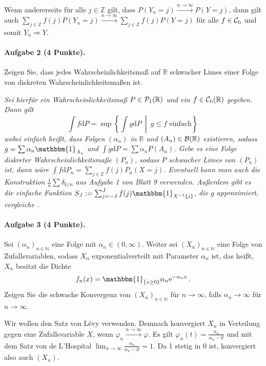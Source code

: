 \documentclass{article}
\begin{document}
Wenn andererseits für alle $j\in\mathbb{Z}$ gilt, dass $P(Y_n=j)\xrightarrow{n\to\infty}P(Y=j)$, dann gilt auch $\sum_{j\in\mathbb{Z}}f(j)P(Y_n=j)\xrightarrow{n\to\infty}\sum_{j\in\mathbb{Z}}f(j)P(Y=j)$ für alle $f\in{\cal C}_\mathrm{b}$ und somit $Y_n\Rightarrow Y$.
\newpage

\paragraph{Aufgabe 2 \textnormal{(4 Punkte)}.}
Zeigen Sie, dass jedes Wahrscheinlichkeitsmaß auf $\mathbb{R}$ schwacher Limes einer Folge von diskreten Wahrscheinlichkeitsmaßen ist.

\emph{Sei hierfür ein Wahrscheinlichkeitsmaß $P\in{\cal P}_1(\mathbb{R})$ und ein $f\in{\cal C}_\mathrm{b}(\mathbb{R})$ gegeben.
Dann gilt
\[
\int f\mathrm{d}P=\sup\left\{\int g\mathrm{d}P~\middle\vert~ g\leq f\text{ einfach}\right\}\,
\]
wobei einfach heißt, dass Folgen $(\alpha_n)$ in $\mathbb{R}$ und $(A_n)\in{\cal B}(\mathbb{R})$ existieren, sodass $g=\sum\alpha_n \mathbbm{1}_{A_n}$ und $\int g\mathrm{d}P=\sum\alpha_n P(A_n)$.
Gebe es eine Folge diskreter Wahrscheinlichkeitsmaße $(P_n)$, sodass $P$ schwacher Limes von $(P_n)$ ist, dann wäre $\int f\mathrm{d}P_n=\sum_{j\in\mathbb{Z}}f(j)P_n(X=j)$.
Eventuell kann man auch die Konstruktion $\frac{1}{n}\sum\delta_{k/n}$ aus Aufgabe 1 von Blatt 9 verwenden.
Außerdem gibt es die einfache Funktion $S_J:=\sum_{j=-J}^Jf(j)\mathbbm{1}_{X^{-1}\{j\}}$, die $g$ approximiert, vergleiche \cite{217980}.}
\newpage

\paragraph{Aufgabe 3 \textnormal{(4 Punkte)}.} Sei $(\alpha_n)_{n\in\mathbb{N}}$ eine Folge mit $\alpha_n\in(0,\infty)$.
Weiter sei $(X_n)_{n\in\mathbb{N}}$ eine Folge von Zufallsvariablen, sodass $X_n$ exponentialverteilt mit Parameter $\alpha_n$ ist, das heißt, $X_n$ besitzt die Dichte
\[
  f_n(x)=\mathbbm{1}_{\{x\geq0\}}\alpha_n\mathrm{e}^{-\alpha_n x}\,.
\]
Zeigen Sie die schwache Konvergenz von $(X_n)_{n\in\mathbb{N}}$ für $n\to\infty$, falls $\alpha_n\to\infty$ für $n\to\infty$.

Wir wollen den Satz von Lévy verwenden.
Demnach konvergiert $X_n$ in Verteilung gegen eine Zufallsvariable $X$, wenn $\varphi_n\xrightarrow{n\to\infty}\varphi$.
Es gilt $\varphi_n(t)=\frac{\alpha_n}{\alpha_n-\mathrm{i}t}$ und mit dem Satz von de L'Hospital $\lim_{n\to\infty}\frac{\alpha_n}{\alpha_n-\mathrm{i}t}=1$.
Da 1 stetig in 0 ist, konvergiert also auch $(X_n)$.
\end{document}
